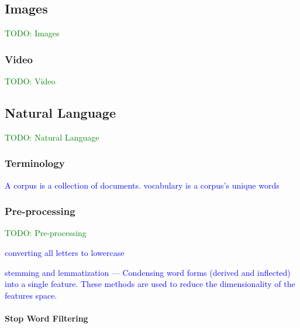 

\subsection{Images}

\textcolor{green}{TODO: Images}


\subsubsection{Video}

\textcolor{green}{TODO: Video}


\subsection{Natural Language}

\textcolor{green}{TODO: Natural Language}

\subsubsection{Terminology}

\textcolor{blue}{A {corpus} is a collection of documents. {vocabulary} is a corpus's unique words}

\subsubsection{Pre-processing}

\textcolor{green}{TODO: Pre-processing}

\textcolor{blue}{converting all letters to lowercase}

\textcolor{blue}{stemming and lemmatization --- Condensing word forms (derived and inflected) into a single feature. These methods are used to reduce the dimensionality of the features space.}

\paragraph{Stop Word Filtering}

